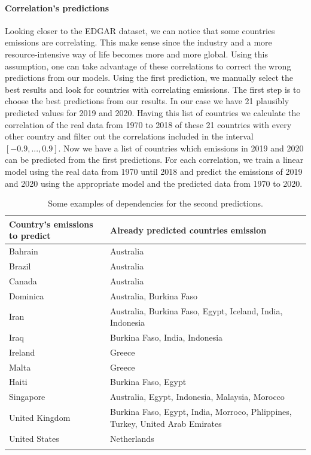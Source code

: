 \paragraph*{Correlation's predictions}
Looking closer to the EDGAR dataset, we can notice that some countries emissions are correlating. This make sense since the industry and a more resource-intensive way of life becomes more and more global. Using this assumption, one can take advantage of these correlations to correct the wrong predictions from our models.
Using the first prediction, we manually select the best results and look for countries with correlating emissions.
The first step is to choose the best predictions from our results. In our case we have 21 plausibly predicted values for 2019 and 2020. Having this list of countries we calculate the correlation of the real data from 1970 to 2018 of these 21 countries with every other country and filter out the correlations included in the interval $[-0.9,...,0.9]$.
Now we have a list of countries which emissions in 2019 and 2020 can be predicted from the first predictions.
For each correlation, we train a linear model using the real data from 1970 until 2018 and predict the emissions of 2019 and 2020 using the appropriate model and the predicted data from 1970 to 2020.
\begin{center}
\begin{table}[h!]%
	\centering
	\begin{tabular}{ll}
		\hline
		 Country's emissions to predict& Already predicted countries emission\\
		\hline
		\hline
		 Bahrain   & Australia   \\
  		 Brazil &   Australia  \\
 		 Canada & Australia \\
 		 Dominica & Australia, Burkina Faso\\
  		 Iran & Australia, Burkina Faso, Egypt, Iceland, India, Indonesia \\
		 Iraq & Burkina Faso, India, Indonesia \\
 		 Ireland & Greece \\
		 Malta & Greece \\
 		 Haiti &  Burkina Faso, Egypt \\
 		 Singapore & Australia, Egypt, Indonesia, Malaysia, Morocco \\
 		 United Kingdom & Burkina Faso, Egypt, India, Morroco, Phlippines, Turkey, United Arab Emirates \\
 		 United States& Netherlands \\
		\hline &\\
	\end{tabular}
	\caption{Some examples of dependencies for the second predictions.}%
	\label{tab:correlations}	
\end{table}	
\end{center}

